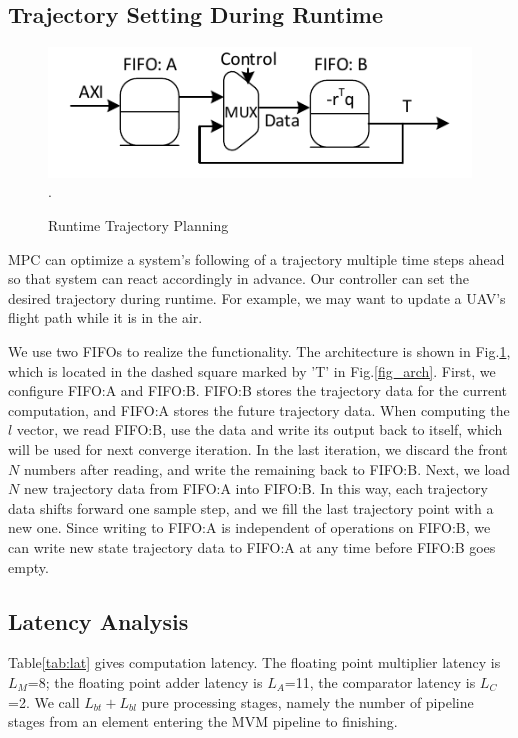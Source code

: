 \subsection{Trajectory Setting During Runtime}
\begin{figure}[t]
\centering
\captionsetup{justification=centering}
\includegraphics[scale=.75]{../figure/trajectoryProfile.pdf}
\DeclareGraphicsExtensions.
\caption{Runtime Trajectory Planning\label{fig_traj}}
\end{figure}

MPC can optimize a system's following of a trajectory multiple time steps ahead so that system can react accordingly in advance. Our controller can set the desired trajectory during runtime. For example, we may want to update a UAV's flight path while it is in the air.\par

We use two FIFOs to realize the functionality. The architecture is shown in Fig.\cref{fig_traj}, which is located in the dashed square marked by 'T' in Fig.\cref{fig_arch}. First, we configure FIFO:A and FIFO:B. FIFO:B stores the trajectory data for the current computation, and FIFO:A stores the future trajectory data. When computing the $l$ vector, we read FIFO:B, use the data and write its output back to itself, which will be used for next converge iteration. In the last iteration, we discard the front $N$ numbers after reading, and write the remaining back to FIFO:B. Next, we load $N$ new trajectory data from FIFO:A into FIFO:B. In this way, each trajectory data shifts forward one sample step, and we fill the last trajectory point with a new one. Since writing to FIFO:A is independent of operations on FIFO:B, we can write new state trajectory data to FIFO:A at any time before FIFO:B goes empty.

\subsection{Latency Analysis}

Table\cref{tab:lat} gives computation latency. The floating point multiplier latency is $L_M$=8; the floating point adder latency is $L_A$=11, the comparator latency is $L_C$=2. We call $L_{bt}+L_{bl}$ pure processing stages, namely the number of pipeline stages from an element entering the MVM pipeline to finishing.


